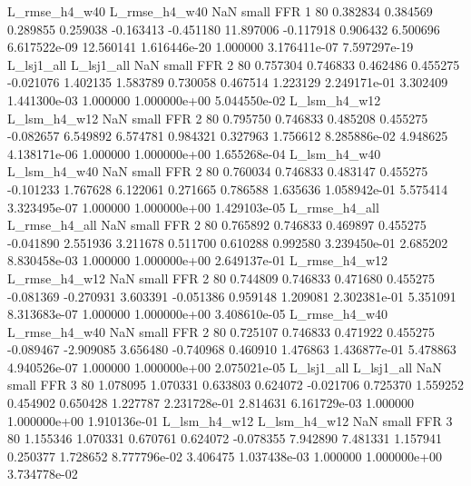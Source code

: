 L_rmse_h4_w40 L_rmse_h4_w40                   NaN      small      FFR                 1 80 0.382834       0.384569 0.289855       0.259038   -0.163413     -0.451180     11.897006    -0.117918       0.906432  6.500696 6.617522e-09    12.560141   1.616446e-20            1.000000    3.176411e-07        7.597297e-19
   L_lsj1_all    L_lsj1_all                   NaN      small      FFR                 2 80 0.757304       0.746833 0.462486       0.455275   -0.021076      1.402135      1.583789     0.730058       0.467514  1.223129 2.249171e-01     3.302409   1.441300e-03            1.000000    1.000000e+00        5.044550e-02
 L_lsm_h4_w12  L_lsm_h4_w12                   NaN      small      FFR                 2 80 0.795750       0.746833 0.485208       0.455275   -0.082657      6.549892      6.574781     0.984321       0.327963  1.756612 8.285886e-02     4.948625   4.138171e-06            1.000000    1.000000e+00        1.655268e-04
 L_lsm_h4_w40  L_lsm_h4_w40                   NaN      small      FFR                 2 80 0.760034       0.746833 0.483147       0.455275   -0.101233      1.767628      6.122061     0.271665       0.786588  1.635636 1.058942e-01     5.575414   3.323495e-07            1.000000    1.000000e+00        1.429103e-05
L_rmse_h4_all L_rmse_h4_all                   NaN      small      FFR                 2 80 0.765892       0.746833 0.469897       0.455275   -0.041890      2.551936      3.211678     0.511700       0.610288  0.992580 3.239450e-01     2.685202   8.830458e-03            1.000000    1.000000e+00        2.649137e-01
L_rmse_h4_w12 L_rmse_h4_w12                   NaN      small      FFR                 2 80 0.744809       0.746833 0.471680       0.455275   -0.081369     -0.270931      3.603391    -0.051386       0.959148  1.209081 2.302381e-01     5.351091   8.313683e-07            1.000000    1.000000e+00        3.408610e-05
L_rmse_h4_w40 L_rmse_h4_w40                   NaN      small      FFR                 2 80 0.725107       0.746833 0.471922       0.455275   -0.089467     -2.909085      3.656480    -0.740968       0.460910  1.476863 1.436877e-01     5.478863   4.940526e-07            1.000000    1.000000e+00        2.075021e-05
   L_lsj1_all    L_lsj1_all                   NaN      small      FFR                 3 80 1.078095       1.070331 0.633803       0.624072   -0.021706      0.725370      1.559252     0.454902       0.650428  1.227787 2.231728e-01     2.814631   6.161729e-03            1.000000    1.000000e+00        1.910136e-01
 L_lsm_h4_w12  L_lsm_h4_w12                   NaN      small      FFR                 3 80 1.155346       1.070331 0.670761       0.624072   -0.078355      7.942890      7.481331     1.157941       0.250377  1.728652 8.777796e-02     3.406475   1.037438e-03            1.000000    1.000000e+00        3.734778e-02
